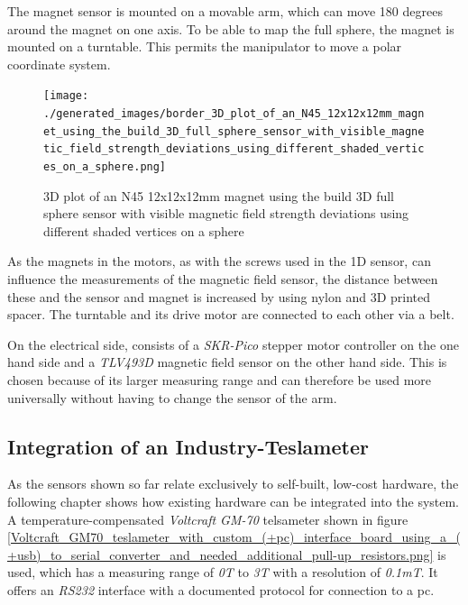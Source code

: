 The magnet sensor is mounted on a movable arm, which can move 180
degrees around the magnet on one axis. To be able to map the full
sphere, the magnet is mounted on a turntable. This permits the
manipulator to move a polar coordinate system.

\begin{figure}
\centering
\texttt{[image: ./generated\_images/border\_3D\_plot\_of\_an\_N45\_12x12x12mm\_magnet\_using\_the\_build\_3D\_full\_sphere\_sensor\_with\_visible\_magnetic\_field\_strength\_deviations\_using\_different\_shaded\_vertices\_on\_a\_sphere.png]}
\caption{3D plot of an N45 12x12x12mm magnet using the build 3D full
sphere sensor with visible magnetic field strength deviations using
different shaded vertices on a sphere
\label{3D_plot_of_an_N45_12x12x12mm_magnet_using_the_build_3D_full_sphere_sensor_with_visible_magnetic_field_strength_deviations_using_different_shaded_vertices_on_a_sphere.png}}
\end{figure}

\newpage

As the magnets in the motors, as with the screws used in the 1D sensor,
can influence the measurements of the magnetic field sensor, the
distance between these and the sensor and magnet is increased by using
nylon and 3D printed spacer. The turntable and its drive motor are
connected to each other via a belt.

On the electrical side, consists of a \emph{SKR-Pico} stepper motor
controller on the one hand side and a \emph{TLV493D} magnetic field
sensor on the other hand side. This is chosen because of its larger
measuring range and can therefore be used more universally without
having to change the sensor of the arm.

\hypertarget{integration-of-an-industry-teslameter}{%
\subsection{Integration of an
Industry-Teslameter}\label{integration-of-an-industry-teslameter}}

As the sensors shown so far relate exclusively to self-built, low-cost
hardware, the following chapter shows how existing hardware can be
integrated into the system. A temperature-compensated \emph{Voltcraft
GM-70} telsameter shown in figure
\ref{Voltcraft_GM70_teslameter_with_custom_(+pc)_interface_board_using_a_(+usb)_to_serial_converter_and_needed_additional_pull-up_resistors.png}
is used, which has a measuring range of \emph{0T} to \emph{3T} with a
resolution of \emph{0.1mT}. It offers an \emph{RS232} interface with a
documented protocol for connection to a \gls{pc}.

